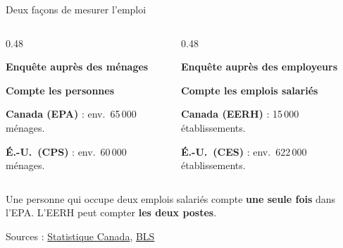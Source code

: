 \documentclass[aspectratio=169]{beamer}
\begin{document}
\begin{frame}[t]{Deux façons de mesurer l'emploi}
   \vspace{0.25cm}
   \begin{columns}[T,onlytextwidth]
      \begin{column}{0.48\textwidth}
         \begin{tcolorbox}[colback=HEClightgray, colframe=HEClightgray, boxrule=0pt, arc=8pt,
               height=3.0cm, boxsep=0pt, left=10pt, right=10pt, top=10pt, bottom=10pt]
            \RaggedRight
            \textbf{\textcolor{HECnavy}{Enquête auprès des ménages}}\par\vspace{0.16cm}
            \small\textbf{Compte les personnes}\par
            \medskip
            {\footnotesize \textbf{Canada (EPA)} : env.\ 65\,000 ménages.\par
            \textbf{É.-U.\ (CPS)} : env.\ 60\,000 ménages.\par}
         \end{tcolorbox}
      \end{column}
      \begin{column}{0.48\textwidth}
         \begin{tcolorbox}[colback=HECgreen!7, colframe=HECgreen!7, boxrule=0pt, arc=8pt,
               height=3.0cm, boxsep=0pt, left=10pt, right=10pt, top=10pt, bottom=10pt]
            \RaggedRight
            \textbf{\textcolor{HECgreen}{Enquête auprès des employeurs}}\par\vspace{0.16cm}
            \small\textbf{Compte les emplois salariés}\par
            \medskip
            {\footnotesize \textbf{Canada (EERH)} : 15\,000 établissements.\par
            \textbf{É.-U.\ (CES)} : env.\ 622\,000 établissements.\par}
         \end{tcolorbox}
      \end{column}
   \end{columns}
   \vspace{0.35cm}
   {\small\RaggedRight Une personne qui occupe deux emplois salariés compte \textbf{une seule fois} dans l'EPA. L'EERH peut compter \textbf{les deux postes}.\par}
   \vfill
   {\scriptsize\hfill Sources : \href{https://www150.statcan.gc.ca/n1/pub/72-203-g/72-203-g2025001-fra.htm}{Statistique Canada},
      \href{https://www.bls.gov/web/empsit/ces_cps_trends.htm}{BLS}\par}
\end{frame}
\end{document}
